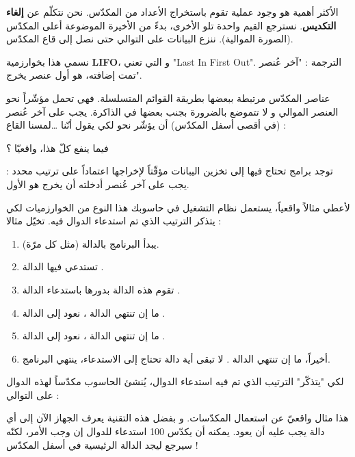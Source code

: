 الأكثر أهمية هو وجود عملية تقوم باستخراج الأعداد من المكدّس. نحن نتكلّم عن
\textbf{إلغاء التكديس}.
نسترجع القيم واحدة تلو الأخرى، بدءً من الأخيرة الموضوعة أعلى المكدّس (الصورة الموالية). ننزع البيانات على التوالي حتى نصل إلى قاع المكدّس.


نسمي هذا بخوارزمية
\textbf{\textenglish{LIFO}}،
و التي تعني
"\textenglish{Last In First Out}".
الترجمة : "آخر عُنصر تمت إضافته، هو أول عنصر يخرج".

عناصر المكدّس مرتبطة ببعضها بطريقة القوائم المتسلسلة. فهي تحمل مؤشّراً نحو العنصر الموالي و لا تتموضع بالضرورة بجنب بعضها في الذاكرة. يجب على آخر عُنصر (في أقصى أسفل المكدّس) أن يؤشّر نحو
لكي يقول أنّنا \dots لمسنا القاع :


\begin{question}
 فيما ينفع كلّ هذا، واقعيّا ؟
\end{question}

توجد برامج تحتاج فيها إلى تخزين اليبانات مؤقّتاً لإخراجها اعتماداً على ترتيب محدد : يجب على آخر عُنصر أدخلته أن يخرج هو الأول.

لأعطي مثالاً واقعياً، يستعمل نظام التشغيل في حاسوبك هذا النوع من الخوارزميات لكي يتذكر الترتيب الذي تم استدعاء الدوال فيه. تخيّل مثالا :

\begin{enumerate}
	\item يبدأ البرنامج بالدالة
	(مثل كل مرّة).
	\item تستدعي فيها الدالة 
	.
	\item تقوم هذه الدالة 
	بدورها باستدعاء الدالة
	.
	\item ما إن تنتهي الدالة
	،
	نعود إلى الدالة
	.
	\item ما إن تنتهي الدالة 
	،
	نعود إلى الدالة 
	.
	\item أخيراً، ما إن تنتهي الدالة
	.
	لا تبقى أية دالة تحتاج إلى الاستدعاء، ينتهي البرنامج.
\end{enumerate}

لكي "يتذكّر" الترتيب الذي تم فيه استدعاء الدوال، يُنشئ الحاسوب مكدّساً لهذه الدوال على التوالي :


هذا مثال واقعيّ عن استعمال المكدّسات. و بفضل هذه التقنية يعرف الجهاز الآن إلى أي دالة يجب عليه أن يعود. يمكنه أن يكدّس 100 استدعاء للدوال إن وجب الأمر، لكنّه سيرجع ليجد الدالة الرئيسية في أسفل المكدّس !

